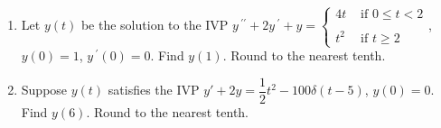 \documentclass{ximera}
\begin{document}
\begin{enumerate}[label=(\arabic*)]


\item Let $y(t)$ be the solution to the IVP $y\,^{\prime\prime}+2y\,^{\prime}+y=\left\{\begin{array}{lr}
       4t & \mbox{ if }0\leq t<2\\
       \\
       t^2 &  \mbox{ if }t\geq 2
     \end{array}\right.$, $y(0)=1$, $y\,^{\prime}(0)=0$.  Find $y(1)$.  Round to the nearest tenth.\\




















\item Suppose $y(t)$ satisfies the IVP $y'+2y=\dfrac{1}{2}t^2-100\delta (t-5)$, $y(0)=0$.  Find $y(6)$.  Round to the nearest tenth.




\end{enumerate}
\end{document}
